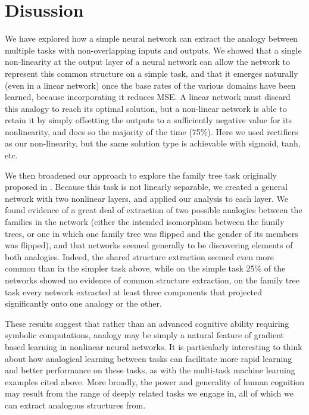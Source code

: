 \documentclass[10pt,letterpaper]{article}
\begin{document}
\section{Disussion}
We have explored how a simple neural network can extract the analogy between multiple tasks with non-overlapping inputs and outputs. We showed that a single non-linearity at the output layer of a neural network can allow the network to represent this common structure on a simple task, and that it emerges naturally (even in a linear network) once the base rates of the various domains have been learned, because incorporating it reduces MSE. A linear network must discard this analogy to reach its optimal solution, but a non-linear network is able to retain it by simply offsetting the outputs to a sufficiently negative value for its nonlinearity, and does so the majority of the time (75\%). Here we used rectifiers as our non-linearity, but the same solution type is achievable with sigmoid, tanh, etc. \par 
We then broadened our approach to explore the family tree task originally proposed in \citet{Hinton1986}. Because this task is not linearly separable, we created a general network with two nonlinear layers, and applied our analysis to each layer. We found evidence of a great deal of extraction of two possible analogies between the families in the network (either the intended isomorphism between the family trees, or one in which one family tree was flipped and the gender of its members was flipped), and that networks seemed generally to be discovering elements of both analogies. Indeed, the shared structure extraction seemed even more common than in the simpler task above, while on the simple task 25\% of the networks showed no evidence of common structure extraction, on the family tree task every network extracted at least three components that projected significantly onto one analogy or the other. \par 
These results suggest that rather than an advanced cognitive ability requiring symbolic computations, analogy may be simply a natural feature of gradient based learning in nonlinear neural networks. It is particularly interesting to think about how analogical learning between tasks can facilitate more rapid learning and better performance on these tasks, as with the multi-task machine learning examples cited above. More broadly, the power and generality of human cognition may result from the range of deeply related tasks we engage in, all of which we can extract analogous structures from. 
\end{document}
